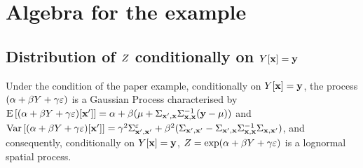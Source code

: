 

\newpage
\section{Algebra for the example}

\subsection{Distribution of  $Z$ conditionally on  $Y[\mathbf{x}]=\mathbf{y}$}\label{sec:A.owifjoeij}
Under the condition of the paper example, conditionally on $Y[\mathbf{x}]=\mathbf{y}$, the process $(\alpha+\beta Y+\gamma\varepsilon)$ is a Gaussian Process characterised by
$\mathrm{E}\left[(\alpha+\beta Y+\gamma\varepsilon)[\mathbf{x}']\right]=\alpha+\beta(\mu+\Sigma_{\mathbf{x}',\mathbf{x}}\Sigma_{\mathbf{x},\mathbf{x}}^{-1} (\mathbf{y}-\mu))$ and  $\mathrm{Var}\left[(\alpha+\beta Y+\gamma\varepsilon)[\mathbf{x}']\right]=\gamma^2\Sigma^\varepsilon_{\mathbf{x}',\mathbf{x}'}+\beta^2(\Sigma_{\mathbf{x}',\mathbf{x}'}-\Sigma_{\mathbf{x}',\mathbf{x}}\Sigma_{\mathbf{x},\mathbf{x}}^{-1}\Sigma_{\mathbf{x},\mathbf{x}'})$, and consequently, conditionally on $Y[\mathbf{x}]=\mathbf{y}$, $Z=\exp(\alpha+\beta Y+\gamma\varepsilon)$ is a lognormal spatial process.

%
%

